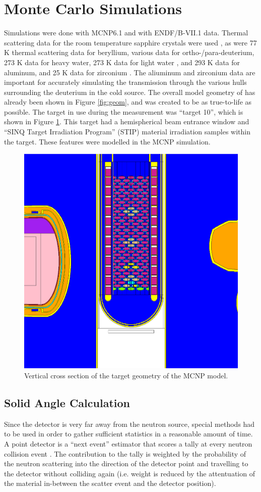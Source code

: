 \documentclass[5p,12pt]{elsarticle}
\begin{document}
\section{Monte Carlo Simulations}
\label{sec:sim}

Simulations were done with MCNP6.1 and with ENDF/B-VII.1 data.  Thermal scattering data for the room temperature sapphire crystals were used \cite{sapp}, as were 77 K thermal scattering data for beryllium, various data for ortho-/para-deuterium, 273 K data for heavy water, 273 K data for light water \cite{mcnp6}, and 293 K data for aluminum, and 25 K data for zirconium \cite{IKE}.  The aliuminum and zirconium data are important for accurately simulating the transmission through the various hulls surrounding the deuterium in the cold source.  The overall model geometry of has already been shown in Figure \ref{fig:geom}, and was created to be as true-to-life as possible.  The target in use during the measurement was ``target 10'', which is shown in Figure \ref{fig:target}. This target had a hemispherical beam entrance window and ``SINQ Target Irradiation Program'' (STIP) material irradiation samples within the target.  These features were modelled in the MCNP simulation.

\begin{figure}[h!] 
  \centering
    \includegraphics[width=0.25\columnwidth,trim={5cm 3cm 5cm 0},clip]{graphics/target.eps}
     \caption{Vertical cross section of the target geometry of the MCNP model. \label{fig:target}}
\end{figure}

%
%
%
%
%

\subsection{Solid Angle Calculation}
\label{subsec:solidangle}

Since the detector is very far away from the neutron source, special methods had to be used in order to gather sufficient statistics in a reasonable amount of time.  A point detector is a ``next event'' estimator that scores a tally at every neutron collision event \cite{mcnp5}.  The contribution to the tally is weighted by the probability of the neutron scattering into the direction of the detector point and travelling to the detector without colliding again (i.e. weight is reduced by the attentuation of the material in-between the scatter event and the detector position).  
\end{document}
